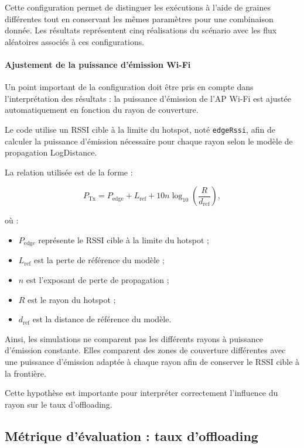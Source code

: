 Cette configuration permet de distinguer les exécutions à l'aide
de graines différentes tout en conservant les mêmes paramètres
pour une combinaison donnée. Les résultats représentent cinq
réalisations du scénario avec les flux aléatoires associés à ces
configurations.

\paragraph{Ajustement de la puissance d'émission Wi-Fi}

Un point important de la configuration doit être pris en compte
dans l'interprétation des résultats : la puissance d'émission
de l'AP Wi-Fi est ajustée automatiquement en fonction du rayon
de couverture.

Le code utilise un RSSI cible à la limite du hotspot,
noté \texttt{edgeRssi}, afin de calculer la puissance d'émission
nécessaire pour chaque rayon selon le modèle de propagation
LogDistance.

La relation utilisée est de la forme :

\[
P_{\mathrm{Tx}}
=
P_{\mathrm{edge}}
+
L_{\mathrm{ref}}
+
10n\log_{10}\left(\frac{R}{d_{\mathrm{ref}}}\right),
\]

où :

\begin{itemize}
\item $P_{\mathrm{edge}}$ représente le RSSI cible à la limite
du hotspot ;
\item $L_{\mathrm{ref}}$ est la perte de référence du modèle ;
\item $n$ est l'exposant de perte de propagation ;
\item $R$ est le rayon du hotspot ;
\item $d_{\mathrm{ref}}$ est la distance de référence du modèle.
\end{itemize}

Ainsi, les simulations ne comparent pas les différents rayons
à puissance d'émission constante. Elles comparent des zones
de couverture différentes avec une puissance d'émission adaptée
à chaque rayon afin de conserver le RSSI cible à la frontière.

Cette hypothèse est importante pour interpréter correctement
l'influence du rayon sur le taux d'offloading.

\subsection{Métrique d'évaluation : taux d'offloading}

